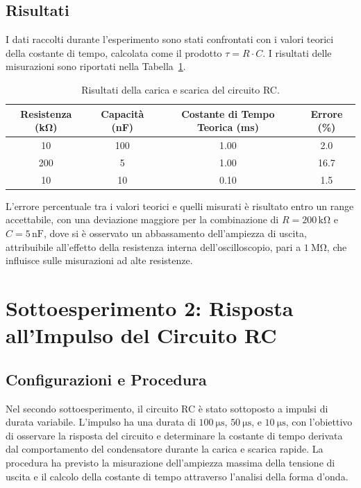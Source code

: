 \documentclass[a4paper,10pt]{article}
\begin{document}
\subsection{Risultati}
I dati raccolti durante l'esperimento sono stati confrontati con i valori teorici della costante di tempo, calcolata come il prodotto \( \tau = R \cdot C \). I risultati delle misurazioni sono riportati nella Tabella~\ref{tab:rc_charge_discharge}.

\begin{table}[H]
\centering
\begin{tabular}{|c|c|c|c|}
\hline
\textbf{Resistenza (\si{\kilo\ohm})} & \textbf{Capacità (\si{\nano\farad})} & \textbf{Costante di Tempo Teorica (\si{\milli\second})} & \textbf{Errore (\%)} \\ \hline
10 & 100 & 1.00 & 2.0 \\ \hline
200 & 5 & 1.00 & 16.7 \\ \hline
10 & 10 & 0.10 & 1.5 \\ \hline
\end{tabular}
\caption{Risultati della carica e scarica del circuito RC.}
\label{tab:rc_charge_discharge}
\end{table}

L'errore percentuale tra i valori teorici e quelli misurati è risultato entro un range accettabile, con una deviazione maggiore per la combinazione di \( R = 200 \, \mathrm{k\Omega} \) e \( C = 5 \, \mathrm{nF} \), dove si è osservato un abbassamento dell'ampiezza di uscita, attribuibile all'effetto della resistenza interna dell'oscilloscopio, pari a \(\SI{1}{\mega\ohm}\), che influisce sulle misurazioni ad alte resistenze.


\section{Sottoesperimento 2: Risposta all'Impulso del Circuito RC}
\subsection{Configurazioni e Procedura}
Nel secondo sottoesperimento, il circuito RC è stato sottoposto a impulsi di durata variabile. L'impulso ha una durata di \(\SI{100}{\micro\second}\), \(\SI{50}{\micro\second}\), e \(\SI{10}{\micro\second}\), con l'obiettivo di osservare la risposta del circuito e determinare la costante di tempo derivata dal comportamento del condensatore durante la carica e scarica rapide. La procedura ha previsto la misurazione dell'ampiezza massima della tensione di uscita e il calcolo della costante di tempo attraverso l'analisi della forma d'onda.
\end{document}
